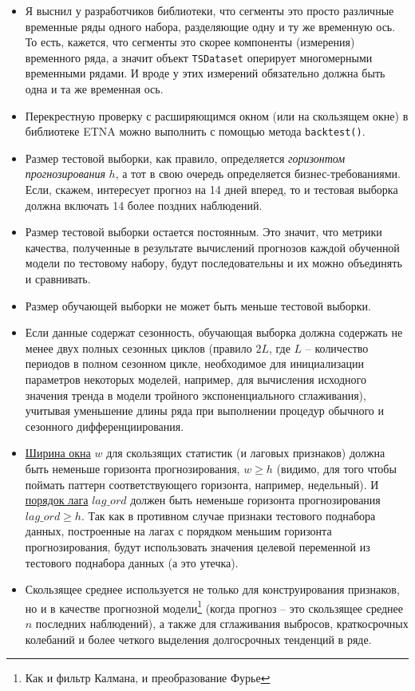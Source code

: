 \documentclass[%
	11pt,
	a4paper,
	utf8,
		]{article}
\begin{document}
\begin{itemize}
	\item Я выснил у разработчиков библиотеки, что сегменты это просто различные временные ряды одного набора, разделяющие одну и ту же временную ось. То есть, кажется, что сегменты это скорее компоненты (измерения) временного ряда, а значит объект \verb|TSDataset| оперирует многомерными временными рядами. И вроде у этих измерений обязательно должна быть одна и та же временная ось.
	
	\item Перекрестную проверку с расширяющимся окном (или на скользящем окне) в библиотеке ETNA можно выполнить с помощью метода \verb|backtest()|. 
	
	\item Размер тестовой выборки, как правило, определяется \emph{горизонтом прогнозирования} $ h $, а тот в свою очередь определяется бизнес-требованиями. Если, скажем, интересует прогноз на 14 дней вперед, то и тестовая выборка должна включать 14 более поздних наблюдений.
	
	\item Размер тестовой выборки остается постоянным. Это значит, что метрики качества, полученные в результате вычислений прогнозов каждой обученной модели по тестовому набору, будут последовательны и их можно объединять и сравнивать.
	
	\item Размер обучающей выборки не может быть меньше тестовой выборки.
	
	\item Если данные содержат сезонность, обучающая выборка должна содержать не менее двух полных сезонных циклов (правило $ 2 L $, где $ L $ -- количество периодов в полном сезонном цикле, необходимое для инициализации параметров некоторых моделей, например, для вычисления исходного значения тренда в модели тройного экспоненциального сглаживания), учитывая уменьшение длины ряда при выполнении процедур обычного и сезонного дифференциирования.
	
	\item {\color{blue} \underline{Ширина окна} $ w $ для скользящих статистик (и лаговых признаков) должна быть неменьше горизонта прогнозирования, $ w \geqslant h $ (видимо, для того чтобы поймать паттерн соответствующего горизонта, например, недельный). И \underline{порядок лага} $ lag\_ord $ должен быть неменьше горизонта прогнозирования $ lag\_ord \geqslant h $. Так как в противном случае признаки тестового поднабора данных, построенные на лагах с порядком меньшим горизонта прогнозирования, будут использовать значения целевой переменной из тестового поднабора данных (а это утечка)}.
	
	\item Скользящее среднее используется не только для конструирования признаков, но и в качестве прогнозной модели\footnote{Как и фильтр Калмана, и преобразование Фурье} (когда прогноз -- это скользящее среднее $ n $ последних наблюдений), а также для сглаживания выбросов, краткосрочных колебаний и более четкого выделения долгосрочных тенденций в ряде.
\end{itemize}
\end{document}

